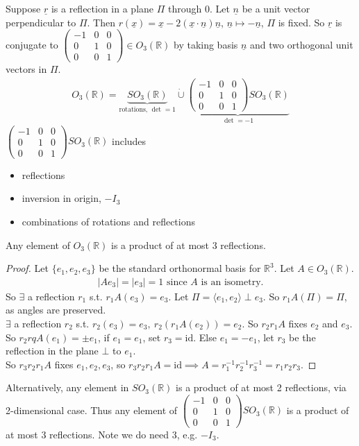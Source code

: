 Suppose $\underline{r}$ is a reflection in a plane $\Pi$ through 0.
Let $\underline{n}$ be a unit vector perpendicular to $\Pi$.
Then $r(\underline{x}) = \underline{x} - 2 (\underline{x} \cdot \underline{n}) \underline{n}$, $\underline{n} \mapsto - \underline{n}$, $\Pi$ is fixed.
So $\underline{r}$ is conjugate to $\begin{pmatrix}-1 & 0 & 0 \\0 & 1 & 0 \\0 & 0 & 1\end{pmatrix} \in O_3(\mathbb{R})$ by taking basis $\underline{n}$ and two orthogonal unit vectors in $\Pi$.
\begin{align*}
    O_3(\mathbb{R}) = \underbrace{SO_3(\mathbb{R})}_\text{rotations, $\det = 1$} \mathbin{\dot{\cup}} \underbrace{\begin{pmatrix}-1 & 0 & 0 \\0 & 1 & 0 \\0 & 0 & 1\end{pmatrix} SO_3(\mathbb{R})}_{\det = -1}
\end{align*} 
$\begin{pmatrix}-1 & 0 & 0 \\0 & 1 & 0 \\0 & 0 & 1\end{pmatrix} SO_3(\mathbb{R})$ includes
\begin{itemize}
    \item reflections
    \item inversion in origin, $-I_3$
    \item combinations of rotations and reflections
\end{itemize} 

\begin{theorem}\label{thm:13}
    Any element of $O_3(\mathbb{R})$ is a product of at most 3 reflections.
\end{theorem} 

\begin{proof}
    Let $\{e_1, e_2, e_3\}$ be the standard orthonormal basis for $\mathbb{R}^3$.
    Let $A \in O_3(\mathbb{R})$.
    \begin{align*}
        |A e_3| = |e_3| = 1 \text{ since $A$ is an isometry.}
    \end{align*} 
    So $\exists$ a reflection $r_1$ s.t. $r_1 A(e_3) = e_3$.
    Let $\Pi = \langle e_1, e_2 \rangle \perp e_3$.
    So $r_1 A(\Pi) = \Pi$, as angles are preserved. \\
    $\exists$ a reflection $r_2$ s.t. $r_2(e_3) = e_3,\ r_2(r_1 A (e_2)) = e_2$.
    So $r_2 r_1 A$ fixes $e_2$ and $e_3$. \\
    So $r_2 rq A (e_1) = \pm e_1$, if $e_1 = e_1$, set $r_3 = \text{id}$.
    Else $e_1 = - e_1$, let $r_3$ be the reflection in the plane $\bot$ to $e_1$. \\
    So $r_3 r_2 r_1 A$ fixes $e_1, e_2, e_3$, so $r_3 r_2 r_1 A = \text{id} \implies A = r_1^{-1} r_2^{-1} r_3^{-1} = r_1 r_2 r_3$.
\end{proof} 

Alternatively, any element in $SO_3(\mathbb{R})$ is a product of at most 2 reflections, via 2-dimensional case.
Thus any element of $\begin{pmatrix}-1 & 0 & 0 \\0 & 1 & 0 \\0 & 0 & 1\end{pmatrix} SO_3(\mathbb{R})$ is a product of at most 3 reflections.
Note we do need $3$, e.g. $-I_3$.